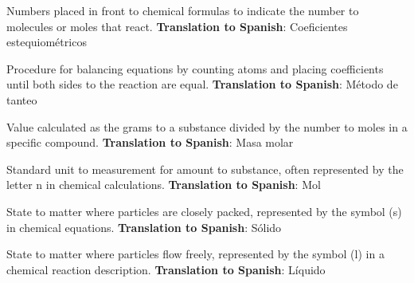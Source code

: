 \begin{vocabulary}
      Numbers placed in front to chemical formulas to indicate the number to molecules or moles that react. \newline
       \textbf{Translation to Spanish}: Coeficientes estequiométricos \newline
\end{vocabulary}

\begin{vocabulary}
      Procedure for balancing equations by counting atoms and placing coefficients until both sides to the reaction are equal. \newline
       \textbf{Translation to Spanish}: Método de tanteo \newline
\end{vocabulary}

\begin{vocabulary}
      Value calculated as the grams to a substance divided by the number to moles in a specific compound. \newline
       \textbf{Translation to Spanish}: Masa molar \newline
\end{vocabulary}

\begin{vocabulary}[Mole]
      Standard unit to measurement for amount to substance, often represented by the letter n in chemical calculations. \newline
       \textbf{Translation to Spanish}: Mol \newline
\end{vocabulary}

\begin{vocabulary}[Solid]
      State to matter where particles are closely packed, represented by the symbol (s) in chemical equations. \newline
       \textbf{Translation to Spanish}: Sólido \newline
\end{vocabulary}

\begin{vocabulary}[Liquid]
      State to matter where particles flow freely, represented by the symbol (l) in a chemical reaction description. \newline
       \textbf{Translation to Spanish}: Líquido \newline
\end{vocabulary}

